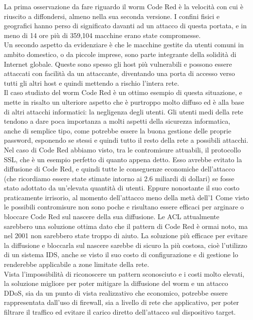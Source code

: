 La prima osservazione da fare riguardo il worm Code Red è la velocità con cui è riuscito a diffondersi, almeno nella sua seconda versione. I confini fisici e geografici hanno perso di significato davanti ad un attacco di questa portata, e in meno di 14 ore più di 359,104 macchine erano state compromesse.\\
Un secondo aspetto da evidenziare è che le macchine gestite da utenti comuni in ambito domestico, o da piccole imprese, sono parte integrante della solidità di Internet globale. Queste sono spesso gli host più vulnerabili e possono essere attaccati con facilità da un attaccante, diventando una porta di accesso verso tutti gli altri host e quindi mettendo a rischio l’intera rete.\\
Il caso studiato del worm Code Red è un ottimo esempio di questa situazione, e mette in risalto un ulteriore aspetto che è purtroppo molto diffuso ed è alla base di altri attacchi informatici: la negligenza degli utenti. Gli utenti medi della rete tendono a dare poca importanza a molti aspetti della sicurezza informatica, anche di semplice tipo, come potrebbe essere la buona gestione delle proprie password, esponendo se stessi e quindi tutto il resto della rete a possibili attacchi. Nel caso di Code Red abbiamo visto, tra le contromisure attuabili, il protocollo SSL, che è un esempio perfetto di quanto appena detto. Esso avrebbe evitato la diffusione di Code Red, e quindi tutte le conseguenze economiche dell’attacco (che ricordiamo essere state stimate intorno ai 2.6 miliardi di dollari) se fosse stato adottato da un’elevata quantità di utenti. Eppure nonostante il suo costo praticamente irrisorio, al momento dell'attacco meno della metà dell’1%
Come visto le possibili contromisure non sono poche e risultano essere efficaci per arginare o bloccare Code Red sul nascere della sua diffusione. Le ACL attualmente sarebbero una soluzione ottima dato che il pattern di Code Red è ormai noto, ma nel 2001 non sarebbero state troppo di aiuto. La soluzione più efficace per evitare la diffusione e bloccarla sul nascere sarebbe di sicuro la più costosa, cioè l’utilizzo di un sistema IDS, anche se visto il suo costo di configurazione e di gestione lo renderebbe applicabile a zone limitate della rete.\\
Vista l’impossibilità di riconoscere un pattern sconosciuto e i costi molto elevati, la soluzione migliore per poter mitigare la diffusione del worm e un attacco DDoS, sia da un punto di vista realizzativo che economico, potrebbe essere rappresentata dall’uso di firewall, sia a livello di rete che applicativo, per poter filtrare il traffico ed evitare il carico diretto dell’attacco sul dispositivo target.\\
